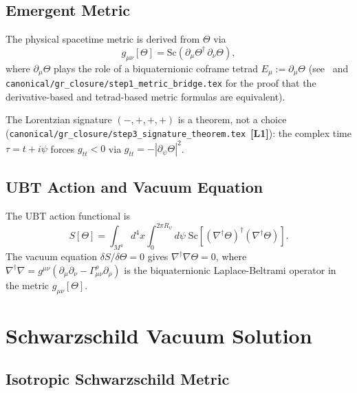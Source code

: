 \documentclass[11pt,a4paper]{article}
\theoremstyle{definition}
\theoremstyle{remark}
\newcommand{\Lone}{\textbf{[L1]}}
\begin{document}
\subsection{Emergent Metric}

The physical spacetime metric is derived from $\Theta$ via
\begin{equation}
  g_{\mu\nu}[\Theta] = \mathrm{Sc}\!\left(\partial_\mu\Theta^\dagger\,
  \partial_\nu\Theta\right),
  \label{eq:metric_def}
\end{equation}
where $\partial_\mu\Theta$ plays the role of a biquaternionic coframe tetrad
$E_\mu := \partial_\mu\Theta$ (see~\cite{UBTAlpha} and
\texttt{canonical/gr\_closure/step1\_metric\_bridge.tex} for the proof
that the derivative-based and tetrad-based metric formulas are equivalent).

The Lorentzian signature $(-,+,+,+)$ is a theorem, not a choice
(\texttt{canonical/gr\_closure/step3\_signature\_theorem.tex}~\Lone):
the complex time $\tau = t + i\psi$ forces $g_{tt} < 0$ via
$g_{tt} = -|\partial_\psi\Theta|^2$.

\subsection{UBT Action and Vacuum Equation}

The UBT action functional is
\begin{equation}
  S[\Theta] = \int_{M^4} d^4x \int_0^{2\pi R_\psi} d\psi\;
  \mathrm{Sc}\!\left[(\nabla^\dagger\Theta)^\dagger(\nabla^\dagger\Theta)\right].
  \label{eq:action}
\end{equation}
The vacuum equation $\delta S/\delta\Theta = 0$ gives
$\nabla^\dagger\nabla\Theta = 0$, where
$\nabla^\dagger\nabla = g^{\mu\nu}(\partial_\mu\partial_\nu - \Gamma^\rho_{\mu\nu}
\partial_\rho)$ is the biquaternionic Laplace-Beltrami operator in the
metric $g_{\mu\nu}[\Theta]$.

\section{Schwarzschild Vacuum Solution}
\label{sec:schwarzschild}

\subsection{Isotropic Schwarzschild Metric}
\end{document}
